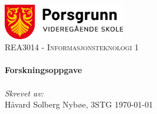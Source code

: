 \begin{titlepage}
    \vbox{ }

    \vbox{ }

    \begin{center}
        \includegraphics[width=0.40\textwidth]{img/porsgrunn-vgs.png}\\[1cm]
        \textsc{\Large REA3014 - Informasjonsteknologi 1}\\[0.6cm]

        \vbox{ }
        \noindent\makebox[\linewidth]{\rule{.7\paperwidth}{.6pt}}\\[0.8cm]
        { \huge \bfseries Forskningsoppgave}\\[0.4cm]
        \noindent\makebox[\linewidth]{\rule{.7\paperwidth}{.6pt}}\\[1.5cm]
        \large
        \emph{Skrevet av:}\\[1mm]
        Håvard Solberg Nybøe, 3STG
        \vfill
        {\large \today}
    \end{center}
\end{titlepage}